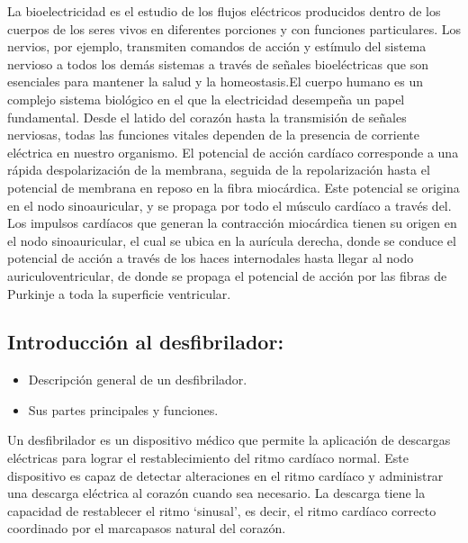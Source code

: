 La bioelectricidad es el estudio de los flujos eléctricos producidos dentro de los cuerpos de los seres vivos en diferentes porciones y con funciones particulares. Los nervios, por ejemplo, transmiten comandos de acción y estímulo del sistema nervioso a todos los demás sistemas a través de señales bioeléctricas que son esenciales para mantener la salud y la homeostasis.El cuerpo humano es un complejo sistema biológico en el que la electricidad desempeña un papel fundamental. Desde el latido del corazón hasta la transmisión de señales nerviosas, todas las funciones vitales dependen de la presencia de corriente eléctrica en nuestro organismo. El potencial de acción cardíaco corresponde a una rápida despolarización de la membrana, seguida de la repolarización hasta el potencial de membrana en reposo en la fibra miocárdica. Este potencial se origina en el nodo sinoauricular, y se propaga por todo el músculo cardíaco a través del. Los impulsos cardíacos que generan la contracción miocárdica tienen su origen en el nodo sinoauricular, el cual se ubica en la aurícula derecha, donde se conduce el potencial de acción a través de los haces internodales hasta llegar al nodo auriculoventricular, de donde se propaga el potencial de acción por las fibras de Purkinje a toda la superficie ventricular.

\subsection{Introducción al desfibrilador:}
\begin{itemize}
    \item Descripción general de un desfibrilador.
    \item Sus partes principales y funciones.
\end{itemize}

Un desfibrilador es un dispositivo médico que permite la aplicación de descargas eléctricas para lograr el restablecimiento del ritmo cardíaco normal. Este dispositivo es capaz de detectar alteraciones en el ritmo cardíaco y administrar una descarga eléctrica al corazón cuando sea necesario. La descarga tiene la capacidad de restablecer el ritmo ‘sinusal’, es decir, el ritmo cardíaco correcto coordinado por el marcapasos natural del corazón.

